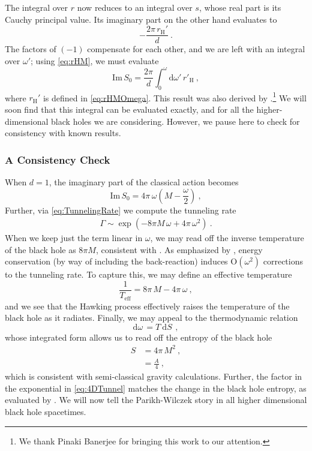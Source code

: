 \documentclass[a4paper,11pt]{article}
\newcommand{\dd}[1]{\text{d}#1 \, }
\newcommand{\im}{\text{Im} \,}
\newcommand{\rH}{r_{\text{H}}}
\begin{document}
The integral over $r$ now reduces to an integral over $s$, whose real part is its Cauchy principal value. Its imaginary part on the other hand evaluates to
\begin{equation}
-\frac{2 \pi \, r_{\text{H}}'}{d} \ .
\end{equation}
The factors of $(-1)$ compensate for each other, and we are left with an integral over $\omega'$; using \eqref{eq:rHM}, we must evaluate 
\begin{equation}
\label{eq:FiniteD}
\im S_0 = \frac{2\pi}{d} \int_{0}^{\omega} \dd{\omega'} r'_{\text{H}} \ ,
\end{equation}
where $\rH'$ is defined in \eqref{eq:rHMOmega}. This result was also derived by \cite{Wei:2014bva}.\footnote{We thank Pinaki Banerjee for bringing this work to our attention.} We will soon find that this integral can be evaluated exactly, and for all the higher-dimensional black holes we are considering. However, we pause here to check for consistency with known results.

\subsubsection{A Consistency Check}
When $d=1$, the imaginary part of the classical action becomes
\begin{equation}
\label{eq:ParikhWilczekResult}
\im S_0 = 4\pi \, \omega \left( M - \frac{\omega}{2} \right) \ ,
\end{equation}
Further,  via \eqref{eq:TunnelingRate} we compute the tunneling rate
\begin{align}
\label{eq:4DTunnel}
\Gamma \sim \exp\left( - 8 \pi M \, \omega + 4\pi\, \omega^2 \right) \ .
\end{align}
When we keep just the term linear in $\omega$, we may read off the inverse temperature of the black hole as $8\pi M$, consistent with \cite{Hawking:1974sw}. As emphasized by \cite{Parikh:1999mf}, energy conservation (by way of including the back-reaction) induces O$(\omega^2)$ corrections to the tunneling rate. To capture this, we may define an effective temperature
\begin{equation}
\frac{1}{T_{\text{eff}}} = 8 \pi \, M - 4\pi\, \omega \ ,
\end{equation}
and we see that the Hawking process effectively raises the temperature of the black hole as it radiates. Finally, we may appeal to the thermodynamic relation
\begin{equation}
\dd{\omega} = T \ \dd{S} \ ,
\end{equation}
whose integrated form allows us to read off the entropy of the black hole
\begin{align}
S &= 4 \pi \, M^2 \ , \\
&= \frac{A}{4} \ ,
\end{align}
which is consistent with semi-classical gravity calculations. Further, the factor in the exponential in \eqref{eq:4DTunnel} matches the change in the black hole entropy, as evaluated by \cite{KeskiVakkuri:1996xp,Massar:1999wg}. We will now tell the Parikh-Wilczek story in all higher dimensional black hole spacetimes.
\end{document}
